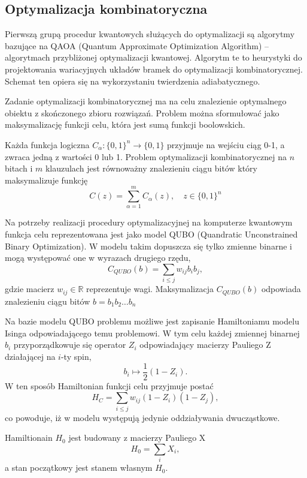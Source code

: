 \documentclass[a4paper,11pt]{article}
\begin{document}
\subsection{Optymalizacja kombinatoryczna}

Pierwszą grupą procedur kwantowych służących do optymalizacji są algorytmy bazujące na QAOA (Quantum Approximate Optimization Algorithm) -- algorytmach przybliżonej optymalizacji kwantowej. Algorytm te to heurystyki do projektowania wariacyjnych układów bramek do optymalizacji kombinatorycznej. Schemat ten opiera się na wykorzystaniu twierdzenia adiabatycznego.


Zadanie optymalizacji kombinatorycznej ma na celu znalezienie optymalnego obiektu z skończonego zbioru rozwiązań. Problem można sformułować jako maksymalizację funkcji celu, która jest sumą funkcji boolowskich.

Każda funkcja logiczna $C_\alpha:\{0,1\}^n\rightarrow\{0,1\}$ przyjmuje na wejściu ciąg 0-1, a zwraca jedną z wartości 0 lub 1. Problem optymalizacji kombinatorycznej na $n$ bitach i $m$ klauzulach jest równoważny znalezieniu ciągu bitów który maksymalizuje funkcję
\[
C (z) = \sum_{\alpha = 1}^m C_\alpha(z), \quad z\in\{0,1\}^n
\] 

Na potrzeby realizacji procedury optymalizacyjnej na komputerze kwantowym funkcja celu reprezentowana jest jako model QUBO (Quandratic Unconstrained Binary Optimization). W modelu takim dopuszcza się tylko zmienne binarne i mogą występować one w wyrazach drugiego rzędu,
\[
C_{QUBO}(b) = \sum_{i\leq j}w_{ij} b_i b_j,
\]
gdzie macierz $w_{ij}\in\mathds{R}$ reprezentuje wagi. Maksymalizacja  $C_{QUBO}(b)$ odpowiada znalezieniu ciągu bitów $b = b_1b_2\dots b_n$

Na bazie modelu QUBO problemu możliwe jest zapisanie Hamiltoniamu modelu Isinga odpowiadającego temu problemowi. W tym celu każdej zmiennej binarnej $b_i$ przyporządkowuje się operator $Z_i$ odpowiadający macierzy Pauliego Z działającej na $i$-ty spin,
\[
b_i \mapsto \frac{1}{2}(1-Z_i).
\]
W ten sposób Hamiltonian funkcji celu przyjmuje postać
\[
H_C = \sum_{i\leq j} w_{ij} (1-Z_i)(1- Z_j),
\]
co powoduje, iż w modelu występują jedynie oddziaływania dwucząstkowe. 

Hamiltionain $H_0$ jest budowany z macierzy Pauliego X
\[
H_0 = \sum_i X_i,
\]
a stan początkowy jest stanem własnym $H_0$. 
\end{document}

